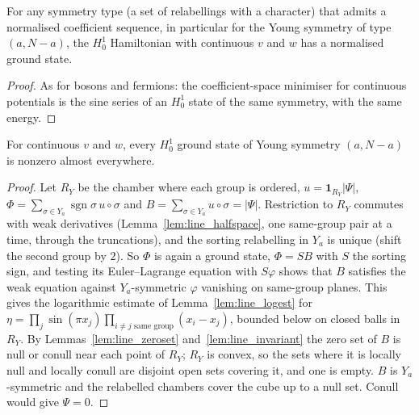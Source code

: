 \begin{theorem}
  \label{thm:line_young_exists}
  \leanok
  For any symmetry type (a set of relabellings with a character) that admits a normalised coefficient sequence,
  in particular for the Young symmetry of type $(a,N-a)$, the $H^1_0$ Hamiltonian with continuous $v$ and $w$ has
  a normalised ground state.
\end{theorem}
\begin{proof}
  \leanok
  As for bosons and fermions: the coefficient-space minimiser for continuous potentials is the sine series of an
  $H^1_0$ state of the same symmetry, with the same energy.
\end{proof}

\begin{theorem}
  \label{thm:line_ucp_young}
  \leanok
  For continuous $v$ and $w$, every $H^1_0$ ground state of Young symmetry $(a,N-a)$ is nonzero almost everywhere.
\end{theorem}
\begin{proof}
  \leanok
  Let $R_Y$ be the chamber where each group is ordered, $u=\mathbf 1_{R_Y}|\Psi|$, $\Phi=\sum_{\sigma\in Y_a}\operatorname{sgn}\sigma\,
  u\circ\sigma$ and $B=\sum_{\sigma\in Y_a}u\circ\sigma=|\Psi|$. Restriction to $R_Y$ commutes with weak derivatives
  (Lemma~\ref{lem:line_halfspace}, one same-group pair at a time, through the truncations), and the sorting relabelling
  in $Y_a$ is unique (shift the second group by $2$). So $\Phi$ is again a ground state, $\Phi=SB$ with $S$ the sorting
  sign, and testing its Euler--Lagrange equation with $S\varphi$ shows that $B$ satisfies the weak equation against
  $Y_a$-symmetric $\varphi$ vanishing on same-group planes. This gives the logarithmic estimate of
  Lemma~\ref{lem:line_logest} for $\eta=\prod_j\sin(\pi x_j)\prod_{i\ne j\text{ same group}}(x_i-x_j)$, bounded below on closed
  balls in $R_Y$. By Lemmas~\ref{lem:line_zeroset} and~\ref{lem:line_invariant} the zero set of $B$ is null or conull
  near each point of $R_Y$; $R_Y$ is convex, so the sets where it is locally null and locally conull are disjoint open
  sets covering it, and one is empty. $B$ is $Y_a$-symmetric and the relabelled chambers cover the cube up to a null
  set. Conull would give $\Psi=0$.
\end{proof}

